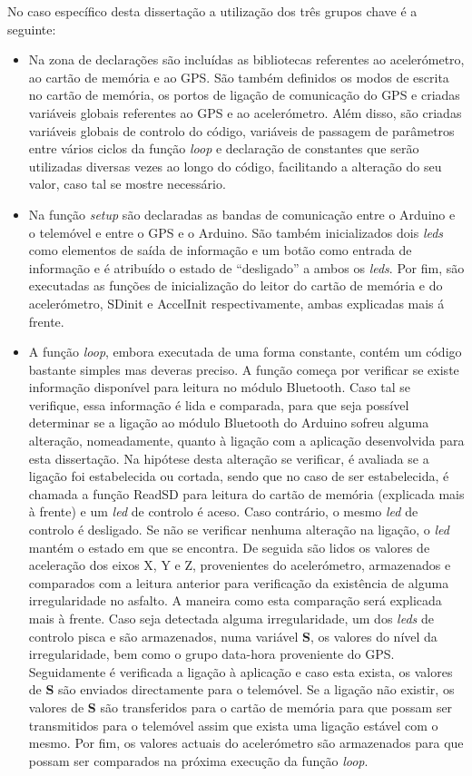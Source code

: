 No caso específico desta dissertação a utilização dos três grupos chave é a seguinte:

\begin{itemize}
\item Na zona de declarações são incluídas as bibliotecas referentes ao acelerómetro, ao cartão de memória e ao GPS. São também definidos os modos de escrita no cartão de memória, os portos de ligação de comunicação do GPS e criadas variáveis globais referentes ao GPS e ao acelerómetro. Além disso, são criadas variáveis globais de controlo do código, variáveis de passagem de parâmetros entre vários ciclos da função \emph{loop} e declaração de constantes que serão utilizadas diversas vezes ao longo do código, facilitando a alteração do seu valor, caso tal se mostre necessário.

\item Na função \emph{setup} são declaradas as bandas de comunicação entre o Arduino e o telemóvel e entre o GPS e o Arduino. São também inicializados dois \emph{leds} como elementos de saída de informação e um botão como entrada de informação e é atribuído o estado de “desligado” a ambos os \emph{leds}. Por fim, são executadas as funções de inicialização do leitor do cartão de memória e do acelerómetro, SD\textunderscore init e AccelInit respectivamente, ambas explicadas mais á frente.

\item A função \emph{loop}, embora executada de uma forma constante, contém um código bastante simples mas deveras preciso. A função começa por verificar se existe informação disponível para leitura no módulo Bluetooth. Caso tal se verifique, essa informação é lida e comparada, para que seja possível determinar se a ligação ao módulo Bluetooth do Arduino sofreu alguma alteração, nomeadamente, quanto à ligação com a aplicação desenvolvida para esta dissertação. Na hipótese desta alteração se verificar, é avaliada se a ligação foi estabelecida ou cortada, sendo que no caso de ser estabelecida, é chamada a função ReadSD para leitura do cartão de memória (explicada mais à frente) e um \emph{led} de controlo é aceso. Caso contrário, o mesmo \emph{led} de controlo é desligado. Se não se verificar nenhuma alteração na ligação, o \emph{led} mantém o estado em que se encontra. De seguida são lidos os valores de aceleração dos eixos X, Y e Z, provenientes do acelerómetro, armazenados e comparados com a leitura anterior para verificação da existência de alguma irregularidade no asfalto. A maneira como esta comparação será explicada mais à frente. Caso seja detectada alguma irregularidade, um dos \emph{leds} de controlo pisca e são armazenados, numa variável \textbf{S}, os valores do nível da irregularidade, bem como o grupo data-hora proveniente do GPS. Seguidamente é verificada a ligação à aplicação e caso esta exista, os valores de \textbf{S} são enviados directamente para o telemóvel. Se a ligação não existir, os valores de \textbf{S} são transferidos para o cartão de memória para que possam ser transmitidos para o telemóvel assim que exista uma ligação estável com o mesmo. Por fim, os valores actuais do acelerómetro são armazenados para que possam ser comparados na próxima execução da função \emph{loop}.
\end{itemize}

